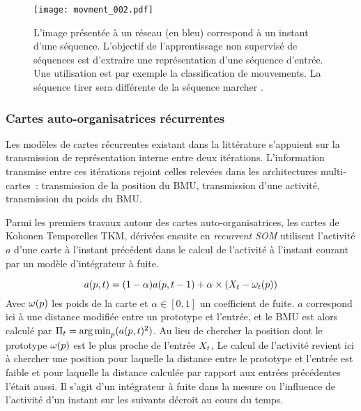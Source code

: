 \documentclass[../main]{subfiles}
\begin{document}
\begin{figure}
    \centering\texttt{[image: movment\_002.pdf]}
    \caption{L'image présentée à un réseau (en bleu) correspond à un instant d'une séquence. L'objectif de l'apprentissage non supervisé de séquences est d'extraire une représentation d'une séquence d'entrée. Une utilisation est par exemple la classification de mouvements. La séquence \og tirer \fg{} sera différente de la séquence \og marcher \fg{}.\label{fig:mouvement}}
 \end{figure}


\subsubsection{Cartes auto-organisatrices récurrentes}

Les modèles de cartes récurrentes existant dans la littérature s'appuient sur la transmission de représentation interne entre deux itérations. 
L'information transmise entre ces itérations rejoint celles relevées dans les architectures multi-cartes~: transmission de la position du BMU, transmission d'une activité, transmission du poids du BMU.

Parmi les premiers travaux autour des cartes auto-organisatrices, les cartes de Kohonen Temporelles TKM, dérivées ensuite en \emph{recurrent SOM} \parencite{varsta_temporal_2001} utilisent l'activité $a$ d'une carte à l'instant précédent dans le calcul de l'activité à l'instant courant par un modèle d'intégrateur à fuite.

$$a(p,t) = (1-\alpha)a(p,t-1) + \alpha \times (X_t - \omega_t(p))$$
Avec $\omega(p)$ les poids de la carte et $\alpha \in [0,1]$ un coefficient de fuite.
$a$ correspond ici à une distance modifiée entre un prototype et l'entrée, et le BMU est alors calculé par $\Pi_t = \operatorname*{arg\,min}_p(a(p,t)^2)$.
Au lieu de chercher la position dont le prototype $\omega(p)$ est le plus proche de l'entrée $X_t$, Le calcul de l'activité revient ici à chercher une position pour laquelle la distance entre le prototype et l'entrée est faible et pour laquelle la distance calculée par rapport aux entrées précédentes l'était aussi. Il s'agit d'un intégrateur à fuite dans la mesure ou l'influence de l'activité d'un instant sur les suivants décroit au cours du temps.
\end{document}
